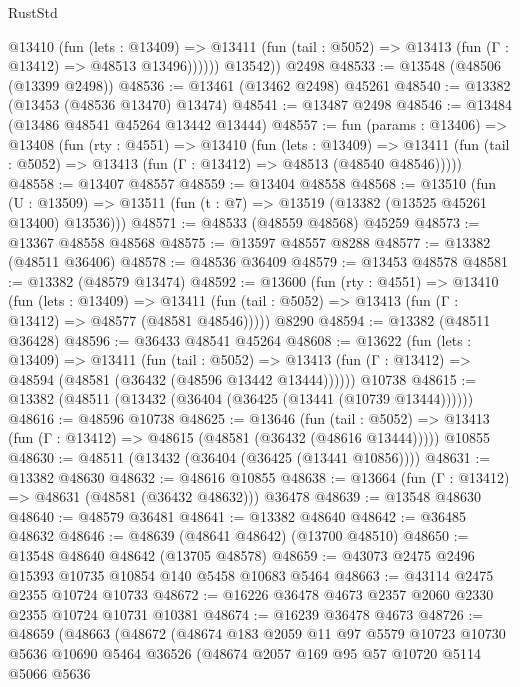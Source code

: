 \begin{lexlean}{RustStd}
\begin{coremodule}
            @13410
              (fun (lets : @13409) =>
              @13411 (fun (tail : @5052) => @13413 (fun (Γ : @13412) => @48513 @13496))))))
        @13542))
    @2498
@48533 := @13548 (@48506 (@13399 @2498))
@48536 := @13461 (@13462 @2498) @45261
@48540 := @13382 (@13453 (@48536 @13470) @13474)
@48541 := @13487 @2498
@48546 := @13484 (@13486 @48541 @45264 @13442 @13444)
@48557 := fun (params : @13406) =>
  @13408
    (fun (rty : @4551) =>
    @13410
      (fun (lets : @13409) =>
      @13411 (fun (tail : @5052) => @13413 (fun (Γ : @13412) => @48513 (@48540 @48546)))))
@48558 := @13407 @48557
@48559 := @13404 @48558
@48568 := @13510
    (fun (U : @13509) => @13511 (fun (t : @7) => @13519 (@13382 (@13525 @45261 @13400) @13536)))
@48571 := @48533 (@48559 @48568) @45259
@48573 := @13367 @48558 @48568
@48575 := @13597 @48557 @8288
@48577 := @13382 (@48511 @36406)
@48578 := @48536 @36409
@48579 := @13453 @48578
@48581 := @13382 (@48579 @13474)
@48592 := @13600
    (fun (rty : @4551) =>
    @13410
      (fun (lets : @13409) =>
      @13411 (fun (tail : @5052) => @13413 (fun (Γ : @13412) => @48577 (@48581 @48546)))))
    @8290
@48594 := @13382 (@48511 @36428)
@48596 := @36433 @48541 @45264
@48608 := @13622
    (fun (lets : @13409) =>
    @13411
      (fun (tail : @5052) =>
      @13413 (fun (Γ : @13412) => @48594 (@48581 (@36432 (@48596 @13442 @13444))))))
    @10738
@48615 := @13382 (@48511 (@13432 (@36404 (@36425 (@13441 (@10739 @13444))))))
@48616 := @48596 @10738
@48625 := @13646
    (fun (tail : @5052) => @13413 (fun (Γ : @13412) => @48615 (@48581 (@36432 (@48616 @13444)))))
    @10855
@48630 := @48511 (@13432 (@36404 (@36425 (@13441 @10856))))
@48631 := @13382 @48630
@48632 := @48616 @10855
@48638 := @13664 (fun (Γ : @13412) => @48631 (@48581 (@36432 @48632))) @36478
@48639 := @13548 @48630
@48640 := @48579 @36481
@48641 := @13382 @48640
@48642 := @36485 @48632
@48646 := @48639 (@48641 @48642) (@13700 @48510)
@48650 := @13548 @48640 @48642 (@13705 @48578)
@48659 := @43073 @2475 @2496 @15393 @10735 @10854 @140 @5458 @10683 @5464
@48663 := @43114 @2475 @2355 @10724 @10733
@48672 := @16226 @36478 @4673 @2357 @2060 @2330 @2355 @10724 @10731 @10381
@48674 := @16239 @36478 @4673
@48726 := @48659
    (@48663
      (@48672
        (@48674
          @183
          @2059
          @11
          @97
          @5579
          @10723
          @10730
          @5636
          @10690
          @5464
          @36526
          (@48674
            @2057
            @169
            @95
            @57
            @10720
            @5114
            @5066
            @5636

\end{coremodule}
\end{lexlean}
